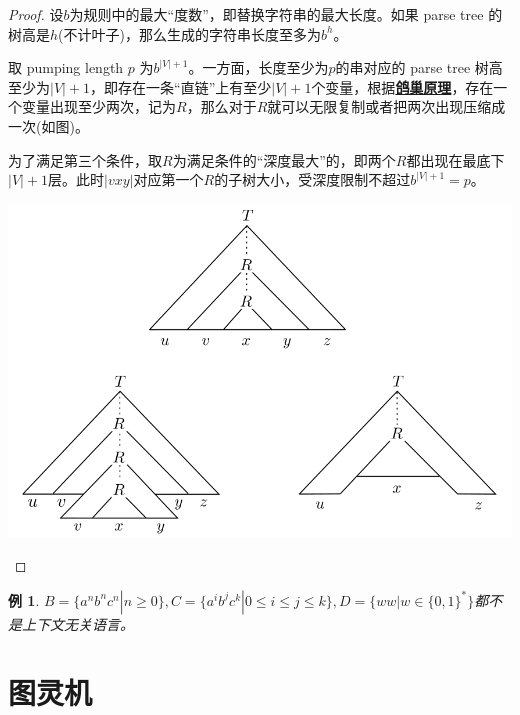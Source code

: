 \documentclass[8pt]{article}
\theoremstyle{compact}
\newtheorem{example}{例}
\def\obj#1{\textbf{\uline{#1}}}
\def\le{\leqslant}
\def\ge{\geqslant}
\begin{document}
\begin{proof}
	设$b$为规则中的最大“度数”，即替换字符串的最大长度。如果 parse tree 的树高是$h$(不计叶子)，那么生成的字符串长度至多为$b^h$。

	取 pumping length $p$ 为$b^{|V|+1}$。一方面，长度至少为$p$的串对应的 parse tree 树高至少为$|V| + 1$，即存在一条“直链”上有至少$|V| + 1$个变量，根据\obj{鸽巢原理}，存在一个变量出现至少两次，记为$R$，那么对于$R$就可以无限复制或者把两次出现压缩成一次(如图)。

	为了满足第三个条件，取$R$为满足条件的“深度最大”的，即两个$R$都出现在最底下$|V| + 1$层。此时$|vxy|$对应第一个$R$的子树大小，受深度限制不超过$b^{|V| + 1} = p$。
	\begin{center}
		\includegraphics[scale=0.3]{pic/pumping_for_CFL.png}		
	\end{center}
\end{proof}
\begin{example}
	$B = \{a^nb^nc^n | n \ge 0\}, C = \{a^ib^jc^k | 0 \le i \le j \le k\}, D = \{ww | w \in \{0, 1\}^*\}$都不是上下文无关语言。
\end{example}

\newpage
\section{图灵机}
\end{document}

